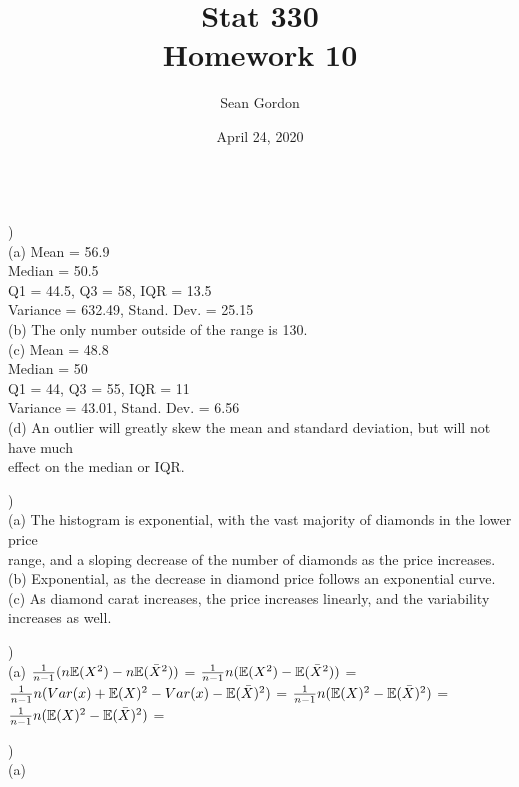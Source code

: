 \documentclass[12pt]{article}
\title{Stat 330\\Homework 10}
\author{Sean Gordon}
\date{April 24, 2020}
\begin{document}
\maketitle


\noindent\hrulefill \\[-.8em]


)\\
\indent (a) Mean = 56.9\\
\indent \indent Median = 50.5\\
\indent \indent Q1 = 44.5, Q3 = 58, IQR = 13.5\\
\indent \indent Variance = 632.49, Stand. Dev. = 25.15\\

\indent (b) The only number outside of the range is 130.\\

\indent (c) Mean = 48.8\\
\indent \indent Median = 50\\
\indent \indent Q1 = 44, Q3 = 55, IQR = 11\\
\indent \indent Variance = 43.01, Stand. Dev. = 6.56\\

\indent (d) An outlier will greatly skew the mean and standard deviation, but will not have much\\
\indent \indent effect on the median or IQR.\\


\noindent \hrulefill 


)\\
\indent (a) The histogram is exponential, with the vast majority of diamonds in the lower price \\
\indent \indent range, and a sloping decrease of the number of diamonds as the price increases.\\

\indent (b) Exponential, as the decrease in diamond price follows an exponential curve.\\

\indent (c) As diamond carat increases, the price increases linearly, and the variability \\
\indent \indent increases as well.\\


\noindent \hrulefill 
\pagebreak


)\\
\indent (a) ${\Large \frac{1}{n-1}}(n\mathbb{E}(X^2) - n\mathbb{E}(\bar{X}^2))$ = ${\Large \frac{1}{n-1}}n(\mathbb{E}(X^2) - \mathbb{E}(\bar{X}^2))$ = \\[.4em]
\indent \indent ${\Large \frac{1}{n-1}}n(Var(x) + \mathbb{E}(X)^2 - Var(x) - \mathbb{E}(\bar{X})^2)$ = ${\Large \frac{1}{n-1}}n(\mathbb{E}(X)^2 - \mathbb{E}(\bar{X})^2)$ = \\[.4em]
\indent \indent ${\Large \frac{1}{n-1}}n(\mathbb{E}(X)^2 - \mathbb{E}(\bar{X})^2)$ = \\


\noindent \hrulefill 


)\\
\indent (a) \\
\end{document}
